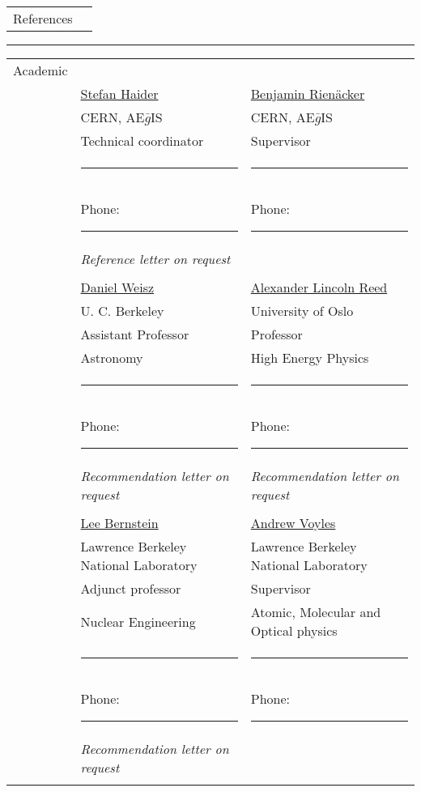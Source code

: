 \documentclass[letterpaper,9pt,oneside]{article}
\begin{document}
\vspace{15mm}  
\newpage
\noindent  
\begin{tabular}{@{} l l} 
	\Large{References}\vspace{1mm}&  \end{tabular}\hrule 
\vspace{5mm} \noindent
 \begin{tabular}{@{} l l l}
	\Large{Academic} \hspace{8mm} & & \\
	
	& 	\href{}{Stefan Haider} & \href{https://www.researchgate.net/profile/Benjamin_Rienaecker}{Benjamin Rienäcker} \\
	& CERN, AE$\bar{g}$IS  &  CERN, AE$\bar{g}$IS \\
	& Technical coordinator& Supervisor\\
	& \small{ \rule{3cm}{5pt}}& \small{ \rule{3cm}{5pt}}\\&\small{Phone:  \rule{3cm}{5pt}	}&\small{Phone: \rule{3cm}{5pt}} \\
	& \textit{Reference letter on request}& \\ 
	&&\\ 
	
	& 	\href{https://astro.berkeley.edu/faculty-profile/daniel-weisz}{Daniel Weisz} & \href{https://www.mn.uio.no/fysikk/english/people/aca/read/index.html}{Alexander Lincoln  Reed} \\
	& U. C. Berkeley& University of Oslo\\
	& Assistant Professor& Professor\\
	& Astronomy &  High Energy Physics  \\
	& \small{ \rule{3cm}{5pt}}& \small{ \rule{3cm}{5pt}} \\&\small{Phone:  \rule{3cm}{5pt}}& \small{Phone:  \rule{3cm}{5pt}}
	\\
	& \textit{Recommendation letter on request}& \textit{Recommendation letter on request}\\ 
	&&\\ 
	
	& 	\href{https://nuc.berkeley.edu/people/lee-a-bernstein/}{Lee Bernstein} & \href{}{Andrew Voyles} \\
	& Lawrence Berkeley National Laboratory& Lawrence Berkeley National Laboratory\\
	& Adjunct professor& Supervisor\\
	& Nuclear Engineering &  Atomic, Molecular and Optical physics \\
	& \small{ \rule{3cm}{5pt}}& \small{ \rule{3cm}{5pt}} \\&\small{Phone:  \rule{3cm}{5pt} }&\small{Phone:  \rule{3cm}{5pt}} \\
	&\textit{Recommendation letter on request}&\\
	&&\\ 
	




\end{tabular}
\end{document}
